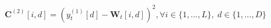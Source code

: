 \documentclass[10pt]{article}
\begin{document}
\begin{align*}\mathbf{C}^{(2)}[i, d] = \left(y_t^{(1)}[d] - \mathbf{W}_t[i, d]\right)^2, 
\forall i \in \{1, \dots, L\}, \; d \in \{1, \dots, D\}
\end{align*}
\end{document}
